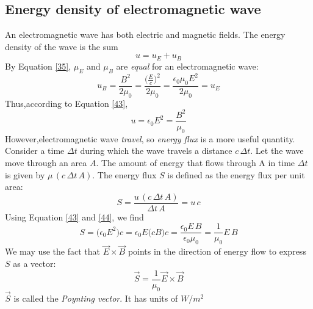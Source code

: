 \documentclass[12pt]{article}
\numberwithin{equation}{section}
\begin{document}
\subsection{Energy density of electromagnetic wave}
An electromagnetic wave has both electric and magnetic fields. The energy density of the wave is the sum
\begin{equation}
    u=u_E+u_B\label{43}
\end{equation}
By Equation \eqref{35}, $\mu_E$ and $\mu_B$ are \emph{equal} for an electromagnetic wave:
\begin{equation}
    u_B=\frac{B^2}{2\mu_0}=\frac{\big(\frac{E}{c}\big)^2}{2\mu_0}=\frac{\epsilon_0\mu_0E^2}{2\mu_0}=u_E\label{44}
\end{equation}
Thus,according to Equation \eqref{43},
\begin{equation}
    u=\epsilon_0E^2=\frac{B^2}{\mu_0}\label{45}
\end{equation}
However,electromagnetic wave \emph{travel}, so \emph{energy flux} is a more useful quantity. Consider a time $\Delta t$ during which the wave travels a distance $c\,\Delta t$. Let the wave move through an area $A$.
The amount of energy that flows through A in time $\Delta t$ is given by $\mu\,(c\,\Delta t\, A)$. The energy flux $S$ is defined as the energy flux per unit area:
\begin{equation}
    S=\frac{u\,(c\,\Delta t\,A)}{\Delta t\,A}=u\,c
\end{equation}
Using Equation \eqref{43} and \eqref{44}, we find
\[
    S=\big(\epsilon_0E^2\big)c=\epsilon_0E\big(cB\big)c=\frac{\epsilon_0E\,B}{\epsilon_0\mu_0}=\frac{1}{\mu_0}E\,B
\]
We may use the fact that $\vec{E}\times\vec{B}$ points in the direction of energy flow to express $S$ as a vector:
\begin{equation}
    \vec{S}=\frac{1}{\mu_0}\vec{E}\times\vec{B}
\end{equation}
$\vec{S}$ is called the \emph{Poynting vector}. It has units of $W/m^2$
\end{document}
